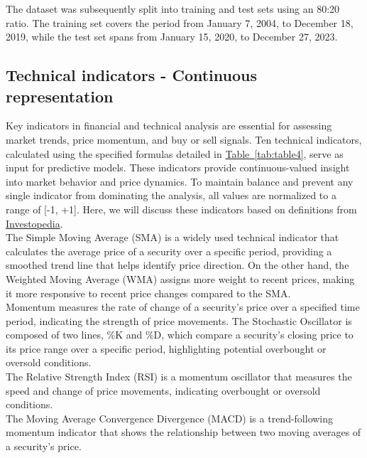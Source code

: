 \documentclass[aodsor,preprint]{imsart}
\numberwithin{equation}{section}
\theoremstyle{plain}
\begin{document}
The dataset was subsequently split into training and test sets using an 80:20 ratio. The training set covers the period from January 7, 2004, to December 18, 2019, while the test set spans from January 15, 2020, to December 27, 2023. \\

\medskip

\subsection{Technical indicators - Continuous representation}

Key indicators in financial and technical analysis are essential for assessing market trends, price momentum, and buy or sell signals. Ten technical indicators, calculated using the specified formulas detailed in \hyperref[tab:table4]{Table~\ref*{tab:table4}}, serve as input for predictive models. These indicators provide continuous-valued insight into market behavior and price dynamics. To maintain balance and prevent any single indicator from dominating the analysis, all values are normalized to a range of [-1, +1]. Here, we will discuss these indicators based on definitions from \href{https://www.investopedia.com/}{Investopedia}.\\

The Simple Moving Average (SMA) is a widely used technical indicator that calculates the average price of a security over a specific period, providing a smoothed trend line that helps identify price direction. On the other hand, the Weighted Moving Average (WMA) assigns more weight to recent prices, making it more responsive to recent price changes compared to the SMA.\\

Momentum measures the rate of change of a security's price over a specified time period, indicating the strength of price movements. The Stochastic Oscillator is composed of two lines, \%K and \%D, which compare a security's closing price to its price range over a specific period, highlighting potential overbought or oversold conditions.\\

The Relative Strength Index (RSI) is a momentum oscillator that measures the speed and change of price movements, indicating overbought or oversold conditions.\\

The Moving Average Convergence Divergence (MACD) is a trend-following momentum indicator that shows the relationship between two moving averages of a security's price.\\
\end{document}
